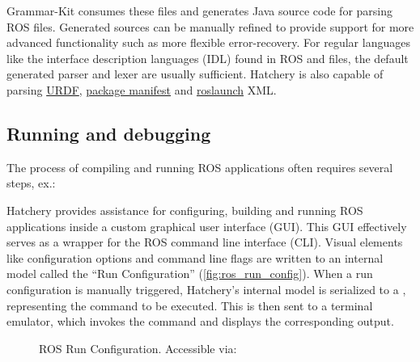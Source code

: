 Grammar-Kit consumes these files and generates Java source code for parsing ROS \href{https://wiki.ros.org/msg}{} files. Generated sources can be manually refined to provide support for more advanced functionality such as more flexible error-recovery. For regular languages like the interface description languages (IDL) found in ROS \href{https://wiki.ros.org/msg}{} and \href{https://wiki.ros.org/srv}{} files, the default generated parser and lexer are usually sufficient. Hatchery is also capable of parsing \href{https://wiki.ros.org/urdf}{URDF}, \href{https://wiki.ros.org/Manifest}{package manifest} and \href{https://wiki.ros.org/roslaunch/XML}{roslaunch} XML.

\subsection{Running and debugging}

The process of compiling and running ROS applications often requires several steps, ex.:
%
%
Hatchery provides assistance for configuring, building and running ROS applications inside a custom graphical user interface (GUI). This GUI effectively serves as a wrapper for the ROS command line interface (CLI). Visual elements like configuration options and command line flags are written to an internal model called the ``Run Configuration'' (\autoref{fig:ros_run_config}). When a run configuration is manually triggered, Hatchery's internal model is serialized to a , representing the command to be executed. This  is then sent to a terminal emulator, which invokes the command and displays the corresponding output.

\begin{figure}
\centering
{}
\caption{ROS Run Configuration. Accessible via: }
\label{fig:ros_run_config}
\end{figure}

